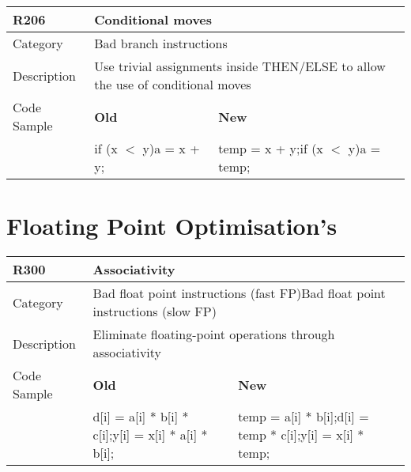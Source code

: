 \begin{tabular}{|p{0.9in}|p{2.0in}|p{2.0in}|} \hline
\textbf{R206}       & \multicolumn{2}{|p{4.0in}|}{\textbf{Conditional moves}} \\ \hline
Category            & \multicolumn{2}{|p{4.0in}|}{Bad branch instructions} \\ \hline
Description         & \multicolumn{2}{|p{4.0in}|}{Use trivial assignments inside THEN/ELSE to allow the use of conditional moves} \\ \hline
Code Sample         & \textbf{Old} & \textbf{New} \\ \hline
                    & if (x $<$ y)\newline   a = x + y;
                    & temp = x + y;\newline if (x $<$ y)\newline   a = temp;  \\ \hline
\end{tabular}

\section{Floating Point Optimisation's}
\label{sec:Floating_Point_Optimizations}

\begin{tabular}{|p{0.9in}|p{2.0in}|p{2.0in}|} \hline
\textbf{R300}       & \multicolumn{2}{|p{4.0in}|}{\textbf{Associativity}} \\ \hline
Category            & \multicolumn{2}{|p{4.0in}|}{Bad float point instructions (fast FP)\newline Bad float point instructions (slow FP)} \\ \hline
Description         & \multicolumn{2}{|p{4.0in}|}{Eliminate floating-point operations through associativity} \\ \hline
Code Sample         & \textbf{Old} & \textbf{New} \\ \hline
                    & d[i] = a[i] * b[i] * c[i];\newline y[i] = x[i] * a[i] * b[i];
                    & temp = a[i] * b[i];\newline d[i] = temp * c[i];\newline y[i] = x[i] * temp;  \\ \hline
\end{tabular}

